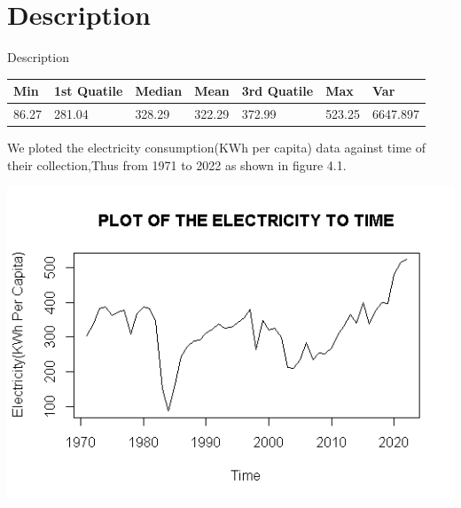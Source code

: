 \documentclass{beamer}
\begin{document}
	
	\section{Description}
	\begin{frame}{Description}
		\begin{table}
		\begin{tabular}{|l|l|l|l|l|l|l|}
\hline
Min & 1st Quatile & Median & Mean & 3rd Quatile & Max & Var \\ \hline
86.27 & 281.04 & 328.29 & 322.29 & 372.99 & 523.25 & 6647.897 \\ \hline
		\end{tabular}
		\end{table}
		
		We ploted the electricity consumption(KWh per capita) data against time of their collection,Thus from 1971 to 2022 as shown in figure 4.1.
		
		
		
	\end{frame}

	\begin{frame}
		\begin{center}
			\includegraphics[width=0.9\linewidth]{images/image1}
		\end{center}
	\end{frame}
	
	
\end{document}
